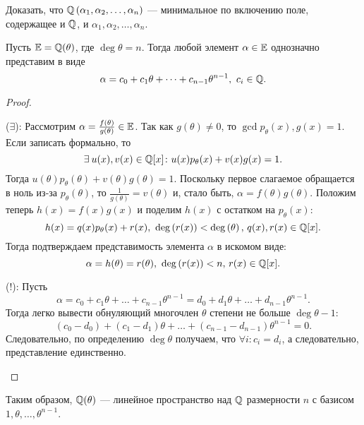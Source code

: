 \begin{nproblem}
\label{prb:IV-2}
    Доказать, что $\mathbb{Q}\left(\alpha_1, \alpha_2, \dots, \alpha_n\right)$ --- минимальное по включению поле, содержащее и $\mathbb{Q}$, и $\alpha_1, \alpha_2, \dots, \alpha_n$.
\end{nproblem}

\begin{nlemma}
\label{lm:IV-5}
    Пусть $\mathbb{E} = \mathbb{Q}(\theta)$, где $\deg{\theta} = n$. Тогда любой элемент $\alpha \in \mathbb{E}$ однозначно представим в виде
    \[
        \alpha = c_0 + c_1\theta + \dots + c_{n-1} \theta^{n-1},\ c_i \in \mathbb{Q}.
    \]
\end{nlemma}
\begin{proof}
\hfill
    \begin{statesp}
        \item[($\exists$):]
            Рассмотрим $\alpha = \frac{f(\theta)}{g(\theta)} \in \mathbb{E}$. Так как $g(\theta) \ne 0$, то ${\gcd{p_{\theta}(x), g(x)} = 1}$. Если записать формально, то
            \[
                \exists u(x), v(x) \in \QQ[x]\colon u(x) p_{\theta}(x) + v(x)g(x) = 1.
            \]
            Тогда $u(\theta) p_{\theta}(\theta) + v(\theta) g(\theta) = 1$. Поскольку первое слагаемое обращается в ноль из-за $p_{\theta}(\theta)$, то $\frac{1}{g(\theta)} = v(\theta)$ и, стало быть, $\alpha = f(\theta) g(\theta)$. Положим теперь ${h(x) = f(x)g(x)}$ и поделим $h(x)$ с остатком на $p_{\theta}(x)$:
            \[
                h(x) = q(x)p_{\theta}(x) + r(x),\ \deg{r(x)} < \deg{\theta},\, q(x), r(x) \in \QQ[x].
            \]
            Тогда подтверждаем представимость элемента $\alpha$ в искомом виде:
            \[
                \alpha = h(\theta) = r(\theta),\ \operatorname{deg}\left( r(x) \right) < n,\, r(x) \in \mathbb{Q}[x].
            \]
        \item[($!$):]
            Пусть 
            \[
                \alpha = c_0 + c_1\theta + \dots + c_{n-1}\theta^{n-1} = d_0 + d_1\theta + \dots + d_{n-1}\theta^{n-1}.
            \]
            Тогда легко вывести обнуляющий многочлен $\theta$ степени не больше $\deg{\theta-1}$:
            \[
                (c_0-d_0) + (c_1-d_1)\theta + \dots + (c_{n-1}-d_{n-1})\theta^{n-1} = 0.
            \]
            Следовательно, по определению $\deg{\theta}$ получаем, что $\forall i\colon c_i = d_i$, а следовательно, представление единственно.
    \end{statesp}
\end{proof}

\begin{remark}
    Таким образом, $\mathbb{Q}(\theta)$ --- линейное пространство над $\mathbb{Q}$ размерности $n$ с базисом $1, \theta, \dots, \theta^{n-1}$.
\end{remark}

